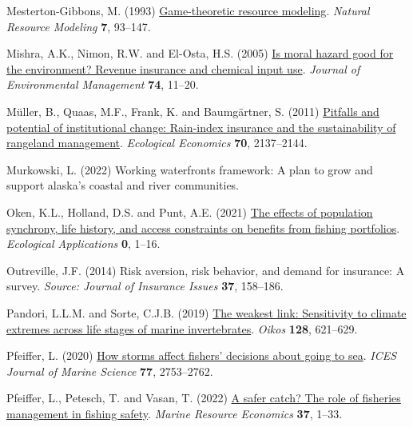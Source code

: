 \documentclass[
  letterpaper,
  DIV=11,
  numbers=noendperiod]{scrartcl}
\newlength{\cslhangindent}
\newlength{\cslentryspacingunit} %
\newenvironment{CSLReferences}[2] %
 {%
  \setlength{\parindent}{0pt}
  \ifodd #1
  \let\oldpar\par
  \def\par{\hangindent=\cslhangindent\oldpar}
  \fi
  \setlength{\parskip}{#2\cslentryspacingunit}
 }%
 {}
\theoremstyle{plain}
\theoremstyle{plain}
\theoremstyle{remark}
\begin{document}
\begin{CSLReferences}{1}{0}
\leavevmode{}%
Mesterton-Gibbons, M. (1993)
\href{https://doi.org/10.1111/j.1939-7445.1993.tb00143.x}{Game-theoretic
resource modeling}. \emph{Natural Resource Modeling} \textbf{7},
93--147.

\leavevmode{}%
Mishra, A.K., Nimon, R.W. and El-Osta, H.S. (2005)
\href{https://doi.org/10.1016/j.jenvman.2004.08.003}{Is moral hazard
good for the environment? Revenue insurance and chemical input use}.
\emph{Journal of Environmental Management} \textbf{74}, 11--20.

\leavevmode{}%
Müller, B., Quaas, M.F., Frank, K. and Baumgärtner, S. (2011)
\href{https://doi.org/10.1016/j.ecolecon.2011.06.011}{Pitfalls and
potential of institutional change: Rain-index insurance and the
sustainability of rangeland management}. \emph{Ecological Economics}
\textbf{70}, 2137--2144.

\leavevmode{}%
Murkowski, L. (2022) Working waterfronts framework: A plan to grow and
support alaska's coastal and river communities.

\leavevmode{}%
Oken, K.L., Holland, D.S. and Punt, A.E. (2021)
\href{https://doi.org/10.1002/eap.2307}{The effects of population
synchrony, life history, and access constraints on benefits from fishing
portfolios}. \emph{Ecological Applications} \textbf{0}, 1--16.

\leavevmode{}%
Outreville, J.F. (2014) Risk aversion, risk behavior, and demand for
insurance: A survey. \emph{Source: Journal of Insurance Issues}
\textbf{37}, 158--186.

\leavevmode{}%
Pandori, L.L.M. and Sorte, C.J.B. (2019)
\href{https://doi.org/10.1111/oik.05886}{The weakest link: Sensitivity
to climate extremes across life stages of marine invertebrates}.
\emph{Oikos} \textbf{128}, 621--629.

\leavevmode{}%
Pfeiffer, L. (2020) \href{https://doi.org/10.1093/icesjms/fsaa145}{How
storms affect fishers' decisions about going to sea}. \emph{ICES Journal
of Marine Science} \textbf{77}, 2753--2762.

\leavevmode{}%
Pfeiffer, L., Petesch, T. and Vasan, T. (2022)
\href{https://doi.org/10.1086/716856}{A safer catch? The role of
fisheries management in fishing safety}. \emph{Marine Resource
Economics} \textbf{37}, 1--33.


\end{CSLReferences}
\end{document}
